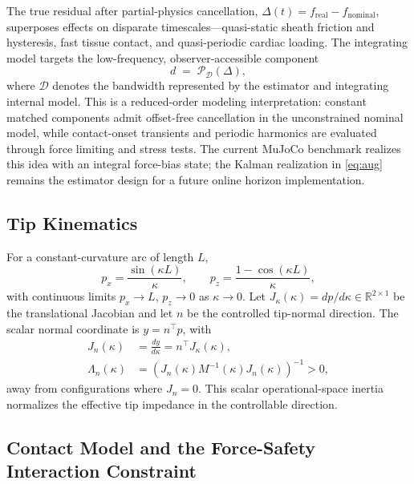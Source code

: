 \begin{remark}\label{rmk:compress}
The true residual after partial-physics cancellation, $\Delta(t)=f_{\text{real}}-f_{\text{nominal}}$, superposes effects on disparate timescales---quasi-static sheath friction and hysteresis, fast tissue contact, and quasi-periodic cardiac loading. The integrating model targets the low-frequency, observer-accessible component
\begin{equation}
d \;=\; \mathcal{P}_{\mathcal D}(\Delta),
\label{eq:compress}
\end{equation}
where $\mathcal D$ denotes the bandwidth represented by the estimator and integrating internal model. This is a reduced-order modeling interpretation: constant matched components admit offset-free cancellation in the unconstrained nominal model, while contact-onset transients and periodic harmonics are evaluated through force limiting and stress tests. The current MuJoCo benchmark realizes this idea with an integral force-bias state; the Kalman realization in \eqref{eq:aug} remains the estimator design for a future online horizon implementation.
\end{remark}

\subsection{Tip Kinematics}\label{sec:kin}

For a constant-curvature arc of length $L$,
\begin{equation}
p_x = \frac{\sin(\kappa L)}{\kappa},\qquad p_z = \frac{1-\cos(\kappa L)}{\kappa},
\label{eq:kin}
\end{equation}
with continuous limits $p_x\to L$, $p_z\to0$ as $\kappa\to0$. Let $J_\kappa(\kappa)=dp/d\kappa\in\mathbb{R}^{2\times1}$ be the translational Jacobian and let $n$ be the controlled tip-normal direction. The scalar normal coordinate is $y=n^\top p$, with
\begin{align}
J_n(\kappa)
&=\frac{dy}{d\kappa}=n^\top J_\kappa(\kappa),\\
\Lambda_n(\kappa)
&=\left(J_n(\kappa)M^{-1}(\kappa)J_n(\kappa)\right)^{-1}>0,
\label{eq:JnLambda}
\end{align}
away from configurations where $J_n=0$. This scalar operational-space inertia normalizes the effective tip impedance in the controllable direction.

\subsection{Contact Model and the Force-Safety Interaction Constraint}

